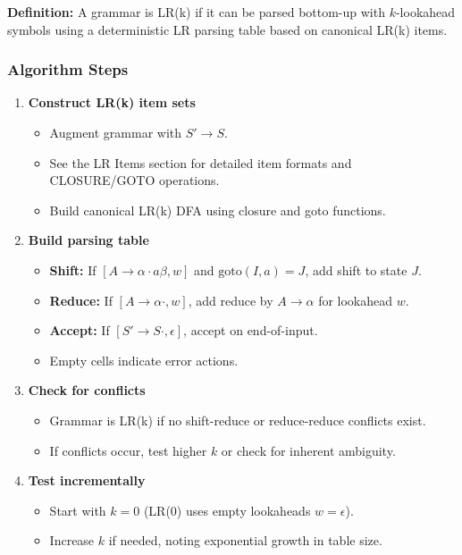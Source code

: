 \textbf{Definition:} A grammar is LR(k) if it can be parsed bottom-up with \( k \)-lookahead symbols using a deterministic LR parsing table based on canonical LR(k) items.

\subsubsection{Algorithm Steps}

\begin{enumerate}
    \item \textbf{Construct LR(k) item sets}
    \begin{itemize}
        \item Augment grammar with \( S' \to S \).
        \item See the LR Items section for detailed item formats and CLOSURE/GOTO operations.
        \item Build canonical LR(k) DFA using closure and goto functions.
    \end{itemize}

    \item \textbf{Build parsing table}
    \begin{itemize}
        \item \textbf{Shift:} If \( [A \to \alpha \cdot a \beta, w] \) and \(\text{goto}(I, a) = J\), add shift to state \( J \).
        \item \textbf{Reduce:} If \( [A \to \alpha \cdot, w] \), add reduce by \( A \to \alpha \) for lookahead \( w \).
        \item \textbf{Accept:} If \( [S' \to S \cdot, \epsilon] \), accept on end-of-input.
        \item Empty cells indicate error actions.
    \end{itemize}

    \item \textbf{Check for conflicts}
    \begin{itemize}
        \item Grammar is LR(k) if no shift-reduce or reduce-reduce conflicts exist.
        \item If conflicts occur, test higher \( k \) or check for inherent ambiguity.
    \end{itemize}

    \item \textbf{Test incrementally}
    \begin{itemize}
        \item Start with \( k = 0 \) (LR(0) uses empty lookaheads \( w = \epsilon \)).
        \item Increase \( k \) if needed, noting exponential growth in table size.
    \end{itemize}
\end{enumerate}

